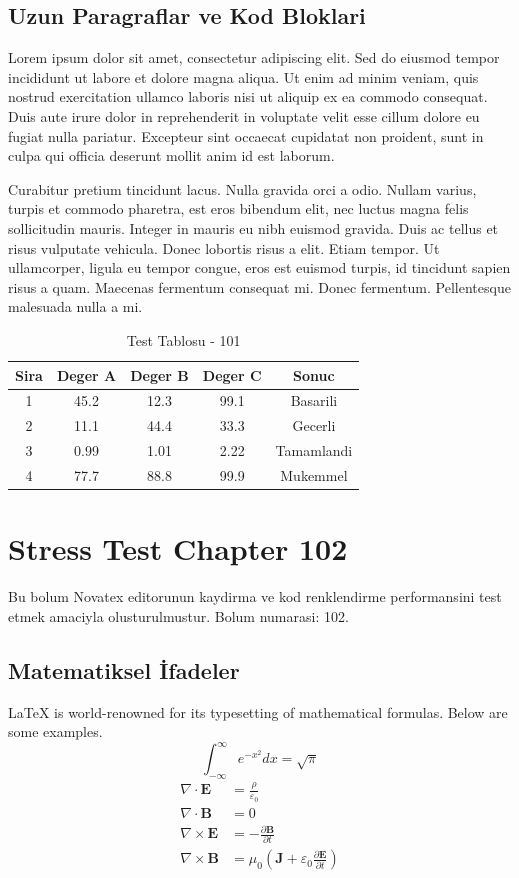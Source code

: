 \documentclass[12pt,a4paper]{article}
\begin{document}
\subsection{Uzun Paragraflar ve Kod Bloklari}
Lorem ipsum dolor sit amet, consectetur adipiscing elit. Sed do eiusmod tempor incididunt ut labore et dolore magna aliqua. Ut enim ad minim veniam, quis nostrud exercitation ullamco laboris nisi ut aliquip ex ea commodo consequat. Duis aute irure dolor in reprehenderit in voluptate velit esse cillum dolore eu fugiat nulla pariatur. Excepteur sint occaecat cupidatat non proident, sunt in culpa qui officia deserunt mollit anim id est laborum.

Curabitur pretium tincidunt lacus. Nulla gravida orci a odio. Nullam varius, turpis et commodo pharetra, est eros bibendum elit, nec luctus magna felis sollicitudin mauris. Integer in mauris eu nibh euismod gravida. Duis ac tellus et risus vulputate vehicula. Donec lobortis risus a elit. Etiam tempor. Ut ullamcorper, ligula eu tempor congue, eros est euismod turpis, id tincidunt sapien risus a quam. Maecenas fermentum consequat mi. Donec fermentum. Pellentesque malesuada nulla a mi.

\begin{table}[h!]
\centering
\begin{tabular}{|c|c|c|c|c|}
\hline
\textbf{Sira} & \textbf{Deger A} & \textbf{Deger B} & \textbf{Deger C} & \textbf{Sonuc} \\
\hline
1 & 45.2 & 12.3 & 99.1 & Basarili \\
2 & 11.1 & 44.4 & 33.3 & Gecerli \\
3 & 0.99 & 1.01 & 2.22 & Tamamlandi \\
4 & 77.7 & 88.8 & 99.9 & Mukemmel \\
\hline
\end{tabular}
\caption{Test Tablosu - 101}
\end{table}

\newpage
\section{Stress Test Chapter 102}
Bu bolum Novatex editorunun kaydirma ve kod renklendirme performansini test etmek amaciyla olusturulmustur. Bolum numarasi: 102.

\subsection{Matematiksel İfadeler}
\LaTeX{} is world-renowned for its typesetting of mathematical formulas. Below are some examples.
\begin{equation}
\int_{-\infty}^{\infty} e^{-x^2} dx = \sqrt{\pi}
\end{equation}
\begin{align}
\nabla \cdot \mathbf{E} &= \frac{\rho}{\varepsilon_0} \\
\nabla \cdot \mathbf{B} &= 0 \\
\nabla \times \mathbf{E} &= -\frac{\partial \mathbf{B}}{\partial t} \\
\nabla \times \mathbf{B} &= \mu_0\left(\mathbf{J} + \varepsilon_0 \frac{\partial \mathbf{E}}{\partial t}\right)
\end{align}
\end{document}
